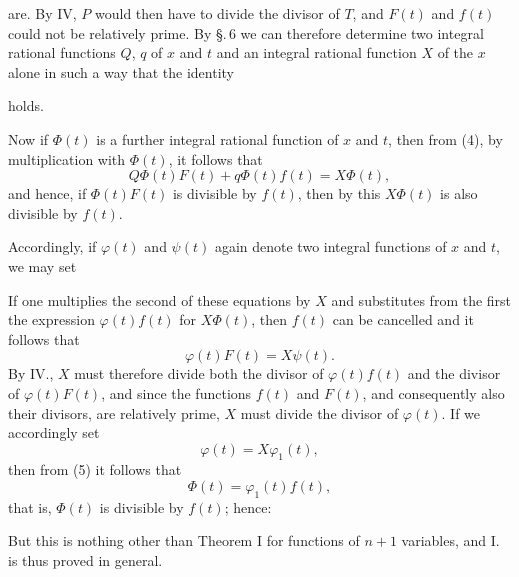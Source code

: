 
are. By IV, $P$ would then have to divide the divisor of $T$, and
$F(t)$ and $f(t)$ could not be relatively prime. By \S.\,6 we can
therefore determine two integral rational functions $Q$, $q$ of $x$
and $t$ and an integral rational function $X$ of the $x$ alone in such a way
that the identity

holds.

Now if $\Phi(t)$ is a further integral rational function of $x$
and $t$, then from (4), by multiplication with $\Phi(t)$, it follows that
\[
Q\Phi(t)F(t) + q\Phi(t)f(t) = X\Phi(t),
\]
and hence, if $\Phi(t)F(t)$ is divisible by $f(t)$, then by this
$X\Phi(t)$ is also divisible by $f(t)$.

Accordingly, if $\varphi(t)$ and $\psi(t)$ again denote two integral
functions of $x$ and $t$, we may set


If one multiplies the second of these equations by $X$ and
substitutes from the first the expression $\varphi(t)f(t)$ for $X\Phi(t)$, then
$f(t)$ can be cancelled and it follows that
\[
\varphi(t)F(t) = X\psi(t).
\]
By IV., $X$ must therefore divide both the divisor of $\varphi(t)f(t)$ and
the divisor of $\varphi(t)F(t)$, and since the functions $f(t)$
and $F(t)$, and consequently also their divisors, are relatively prime, $X$ must
divide the divisor of $\varphi(t)$. If we accordingly set
\[
\varphi(t) = X\varphi_1(t),
\]
then from (5) it follows that
\[
\Phi(t) = \varphi_1(t)f(t),
\]
that is, $\Phi(t)$ is divisible by $f(t)$; hence:


But this is nothing other than Theorem I for functions
of $n + 1$ variables, and I. is thus proved in general.

